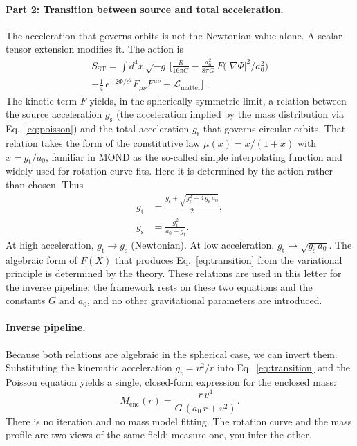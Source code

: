 \documentclass[aps,twocolumn,amsmath,amssymb,reprint,nofootinbib,nobalancelastpage]{revtex4-2}
\begin{document}
\paragraph{Part 2: Transition between source and total acceleration.}
The acceleration that governs orbits is not the Newtonian value alone. A scalar-tensor extension modifies it. The action is
\begin{equation}
\begin{split}
S_{\mathrm{ST}} = \int d^4 x\,\sqrt{-g}\,\bigg[ \frac{R}{16\pi G} - \frac{a_0^2}{8\pi G}\,F\big(|\nabla\Phi|^2/a_0^2\big)
\\
- \frac{1}{4}\,e^{-2\Phi/c^2}F_{\mu\nu}F^{\mu\nu} + \mathcal{L}_{\mathrm{matter}} \bigg].
\end{split}
\label{eq:action}
\end{equation}
The kinetic term $F$ yields, in the spherically symmetric limit, a relation between the source acceleration $g_{\mathrm{s}}$ (the acceleration implied by the mass distribution via Eq.~\ref{eq:poisson}) and the total acceleration $g_{\mathrm{t}}$ that governs circular orbits. That relation takes the form of the constitutive law $\mu(x) = x/(1+x)$ with $x = g_{\mathrm{t}}/a_0$, familiar in MOND as the so-called simple interpolating function and widely used for rotation-curve fits. Here it is determined by the action rather than chosen. Thus
\begin{align}
g_{\mathrm{t}} &= \frac{g_{\mathrm{s}} + \sqrt{g_{\mathrm{s}}^2 + 4\,g_{\mathrm{s}}\,a_0}}{2}, \\
g_{\mathrm{s}} &= \frac{g_{\mathrm{t}}^2}{a_0 + g_{\mathrm{t}}}.
\label{eq:transition}
\end{align}
At high acceleration, $g_{\mathrm{t}} \to g_{\mathrm{s}}$ (Newtonian). At low acceleration, $g_{\mathrm{t}} \to \sqrt{g_{\mathrm{s}}\,a_0}$. The algebraic form of $F(X)$ that produces Eq.~\ref{eq:transition} from the variational principle is determined by the theory. These relations are used in this letter for the inverse pipeline; the framework rests on these two equations and the constants $G$ and $a_0$, and no other gravitational parameters are introduced.

\paragraph{Inverse pipeline.}
Because both relations are algebraic in the spherical case, we can invert them. Substituting the kinematic acceleration $g_{\mathrm{t}} = v^2/r$ into Eq.~\ref{eq:transition} and the Poisson equation yields a single, closed-form expression for the enclosed mass:
\begin{equation}
M_{\mathrm{enc}}(r) = \frac{r\,v^4}{G\,(a_0\,r + v^2)}.
\label{eq:Menc}
\end{equation}
There is no iteration and no mass model fitting. The rotation curve and the mass profile are two views of the same field: measure one, you infer the other.
\end{document}

